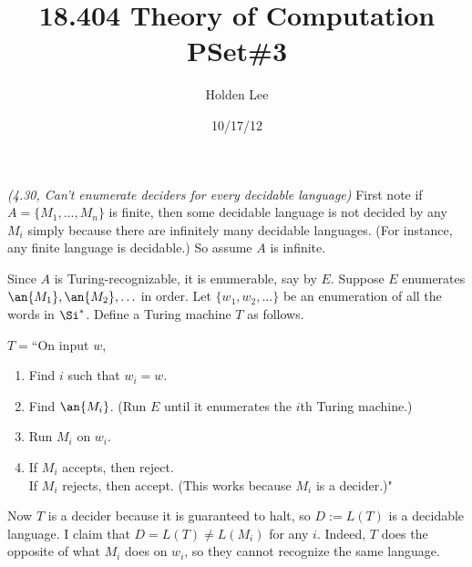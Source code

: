 \title{18.404 Theory of Computation PSet\#3}%
\author{Holden Lee}
\date{10/17/12}%
\maketitle
\begin{problem}{\it(4.30, Can't enumerate deciders for every decidable language)}
First note if $A=\{M_1,\ldots, M_n\}$ is finite, then some decidable language is not decided by any $M_i$ simply because there are infinitely many decidable languages. (For instance, any finite language is decidable.) So assume $A$ is infinite.

Since $A$ is Turing-recognizable, it is enumerable, say by $E$. Suppose $E$ enumerates $\an{M_1},\an{M_2},\ldots$ in order.
Let $\{w_1,w_2,\ldots\}$ be an enumeration of all the words in $\Si^*$. Define a Turing machine $T$ as follows.

$T=$``On input $w$,
\begin{enumerate}
\item Find $i$ such that $w_i=w$.
\item Find $\an{M_i}$. (Run $E$ until it enumerates the $i$th Turing machine.)
\item Run $M_i$ on $w_i$.
\item If $M_i$ accepts, then reject.\\
If $M_i$ rejects, then accept. (This works because $M_i$ is a decider.)"
\end{enumerate}
Now $T$ is a decider because it is guaranteed to halt, so $D:=L(T)$ is a decidable language. I claim that $D=L(T)\ne L(M_i)$ for any $i$. Indeed, $T$ does the opposite of what $M_i$ does on $w_i$, so they cannot recognize the same language.
\end{problem}

\pagebreak

